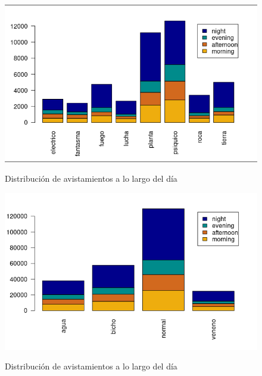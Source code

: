 \begin{figure}[H] %
\centering
\includegraphics[scale=0.8]{img/noche1.png}  %
\label{img/noche1.jpg}
\caption{Distribución de avistamientos a lo largo del día}
\end{figure}

\begin{figure}[H] %
\centering
\includegraphics[scale=0.8]{img/noche2.png}  %
\label{img/noche2.jpg}
\caption{Distribución de avistamientos a lo largo del día}
\end{figure}

